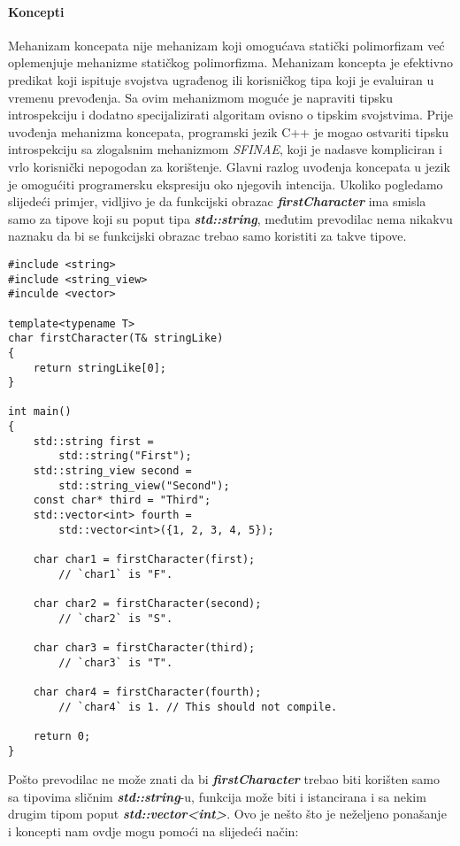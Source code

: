 \paragraph{Koncepti}
Mehanizam koncepata nije mehanizam koji omogućava statički polimorfizam već oplemenjuje mehanizme statičkog polimorfizma. Mehanizam koncepta je efektivno predikat koji ispituje svojstva ugrađenog ili korisničkog tipa koji je evaluiran u vremenu prevođenja. Sa ovim mehanizmom moguće je napraviti tipsku introspekciju i dodatno specijalizirati algoritam ovisno o tipskim svojstvima. Prije uvođenja mehanizma koncepata, programski jezik C++ je mogao ostvariti tipsku introspekciju sa zlogalsnim mehanizmom \textit{SFINAE}, koji je nadasve kompliciran i vrlo korisnički nepogodan za korištenje. Glavni razlog uvođenja koncepata u jezik je omogućiti programersku ekspresiju oko njegovih intencija. Ukoliko pogledamo slijedeći primjer, vidljivo je da funkcijski obrazac \textbf{\textit{firstCharacter}} ima smisla samo za tipove koji su poput tipa \textbf{\textit{std::string}}, međutim prevodilac nema nikakvu naznaku da bi se funkcijski obrazac trebao samo koristiti za takve tipove.
\lstset{language=C++, tabsize=2, frame=single, breaklines=true}
\begin{lstlisting}
#include <string>
#include <string_view>
#inculde <vector>

template<typename T>
char firstCharacter(T& stringLike)
{
    return stringLike[0];
}

int main()
{
    std::string first = 
        std::string("First");
    std::string_view second = 
        std::string_view("Second");
    const char* third = "Third";
    std::vector<int> fourth = 
        std::vector<int>({1, 2, 3, 4, 5});

    char char1 = firstCharacter(first);  
        // `char1` is "F".
    
    char char2 = firstCharacter(second); 
        // `char2` is "S".
    
    char char3 = firstCharacter(third);  
        // `char3` is "T".
    
    char char4 = firstCharacter(fourth); 
        // `char4` is 1. // This should not compile.

    return 0; 
}
\end{lstlisting}
Pošto prevodilac ne može znati da bi \textbf{\textit{firstCharacter}} trebao biti korišten samo sa tipovima sličnim \textbf{\textit{std::string}}-u, funkcija može biti i istancirana i sa nekim drugim tipom poput \textbf{\textit{std::vector<int>}}. Ovo je nešto što je neželjeno ponašanje i koncepti nam ovdje mogu pomoći na slijedeći način:
